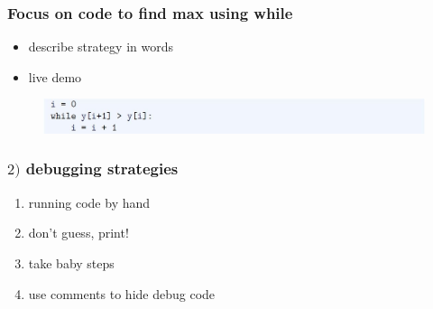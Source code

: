 \documentclass[14pt]{beamer}
\begin{document}

\begin{frame}[fragile]

\frametitle{Focus on code to find max using while}

\begin{itemize}
	\item describe strategy in words
	\item live demo
\end{itemize}


\begin{figure}[ht]
	\centering
	\includegraphics[width=\textwidth]{figures/LLp71d}
\end{figure}

\end{frame}


\begin{frame}[fragile]

\frametitle{$2)$ debugging strategies}

\begin{enumerate}
	\item running code by hand
	\item don't guess, print!
	\item take baby steps
	\item use comments to hide debug code
\end{enumerate}

\end{frame}

\end{document}
